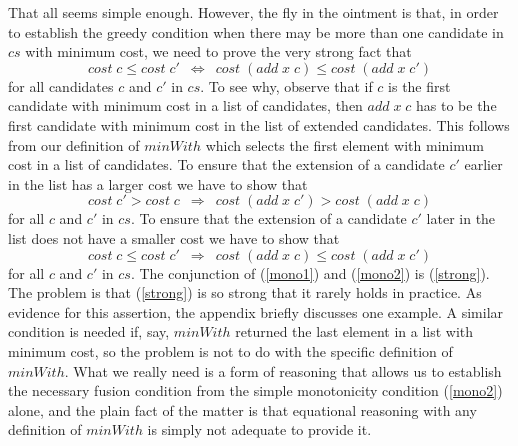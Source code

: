 \documentclass{llncs}
\newcommand{\Varid}[1]{\mathit{#1}}
\renewcommand{\leq}{\leqslant}
\begin{document}
That all seems simple enough. However, the fly in the ointment is that, in order to 
establish the greedy condition when there may be more than one candidate in \ensuremath{\Varid{cs}} with 
minimum cost, we need to prove the very strong fact that
\begin{equation}
\label{strong}
\ensuremath{\Varid{cost}\;\Varid{c}\leq \Varid{cost}\;\Varid{c'}\enspace\Leftrightarrow\enspace\Varid{cost}\;(\Varid{add}\;\Varid{x}\;\Varid{c})\leq \Varid{cost}\;(\Varid{add}\;\Varid{x}\;\Varid{c'})}
\end{equation}
for all candidates \ensuremath{\Varid{c}} and \ensuremath{\Varid{c'}} in \ensuremath{\Varid{cs}}. To see why, observe that if \ensuremath{\Varid{c}} is the 
first candidate with minimum cost in a list of candidates, then \ensuremath{\Varid{add}\;\Varid{x}\;\Varid{c}} has to be the first 
candidate with minimum cost in the list of extended candidates. This follows from our definition 
of \ensuremath{\Varid{minWith}} which selects the first element with minimum cost in a list of candidates. To ensure 
that the extension of a candidate \ensuremath{\Varid{c'}} earlier in the list has a larger cost we have to show that
\begin{equation}
\label{mono1}
\ensuremath{\Varid{cost}\;\Varid{c'}\mathbin{>}\Varid{cost}\;\Varid{c}\enspace\Rightarrow\enspace\Varid{cost}\;(\Varid{add}\;\Varid{x}\;\Varid{c'})\mathbin{>}\Varid{cost}\;(\Varid{add}\;\Varid{x}\;\Varid{c})}
\end{equation}
for all \ensuremath{\Varid{c}} and \ensuremath{\Varid{c'}} in \ensuremath{\Varid{cs}}. To ensure that the extension of a candidate \ensuremath{\Varid{c'}} later in the list 
does not have a smaller cost we have to show that 
\begin{equation}
\label{mono2}
\ensuremath{\Varid{cost}\;\Varid{c}\leq \Varid{cost}\;\Varid{c'}\enspace\Rightarrow\enspace\Varid{cost}\;(\Varid{add}\;\Varid{x}\;\Varid{c})\leq \Varid{cost}\;(\Varid{add}\;\Varid{x}\;\Varid{c'})}
\end{equation}
for all \ensuremath{\Varid{c}} and \ensuremath{\Varid{c'}} in \ensuremath{\Varid{cs}}. The conjunction of (\ref{mono1}) and (\ref{mono2}) is 
(\ref{strong}). The problem is that (\ref{strong}) is so strong that it rarely holds in 
practice. As evidence for this assertion, the appendix briefly discusses one example. A similar 
condition is needed if, say, \ensuremath{\Varid{minWith}} returned the last element in a list with minimum cost, 
so the problem is not to do with the specific definition of \ensuremath{\Varid{minWith}}. What we really need 
is a form of reasoning that allows us to establish the necessary fusion condition from the 
simple monotonicity condition (\ref{mono2}) alone, and the plain fact of the matter is that 
equational reasoning with any definition of \ensuremath{\Varid{minWith}} is simply not adequate to provide it.
\end{document}
